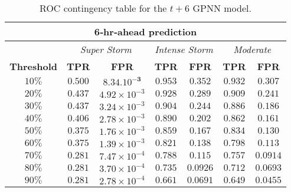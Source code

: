 \begin{table}[ht]
	\centering
	\caption{ROC contingency table for the $t+6$ GPNN model.}
	\label{table:rocgpnn6h}
	\begin{tabular}
		{c| c c | c c | c c}
		\hline
		\multicolumn{7}{c}{\textbf{6‐hr‐ahead prediction}} \\ 
		\hline
		 & \multicolumn{2}{c}{\textit{Super Storm}} & \multicolumn{2}{c}{\textit{Intense Storm}} & \multicolumn{2}{c}{\textit{Moderate}} \\ 
		\hline
		\textbf{Threshold} & \textbf{TPR} & \textbf{FPR} & \textbf{TPR} & \textbf{FPR} & \textbf{TPR} & \textbf{FPR} \\ 
		\hline
		$ 10\%$ & $\mathbf{0.500}$ & $\mathbf{8.34.10^{-3}}$ & $ 0.953 $ & $ 0.352 $ & $ 0.932 $ & $ 0.307 $ \\ 
		$ 20\%$ & $ 0.437 $ & $4.92\times10^{-3}$ & $ 0.928 $ & $ 0.289 $ & $ 0.909 $ & $ 0.241 $ \\ 
		$ 30\%$ & $ 0.437 $ & $3.24\times10^{-3}$ & $ 0.904 $ & $ 0.244 $ & $ 0.886 $ & $ 0.186 $ \\ 
		$ 40\%$ & $ 0.406 $ & $2.78\times10^{-3}$ & $ 0.890 $ & $ 0.202 $ & $ 0.862 $ & $ 0.161 $ \\ 
		$ 50\%$ & $ 0.375 $ & $1.76\times10^{-3}$ & $\mathbf{0.859}$ & $\mathbf{0.167}$ & $\mathbf{0.834}$ & $\mathbf{0.130}$\\ 
		$ 60\%$ & $ 0.375 $ & $1.39\times10^{-3}$ & $ 0.821 $ & $ 0.138 $ & $ 0.798 $ & $ 0.113 $ \\ 
		$ 70\%$ & $ 0.281 $ & $7.47\times10^{-4}$ & $ 0.788 $ & $ 0.115 $ & $ 0.757 $ & $ 0.0914 $ \\ 
		$ 80\%$ & $ 0.281 $ & $3.70\times10^{-4}$ & $ 0.735 $ & $ 0.0926 $ & $ 0.712 $ & $ 0.0693 $ \\ 
		$ 90\%$ & $ 0.281 $ & $2.78\times10^{-4}$ & $ 0.661 $ & $ 0.0691 $ & $ 0.649 $ & $ 0.0455 $ \\
		\hline
	\end{tabular}
\end{table}





